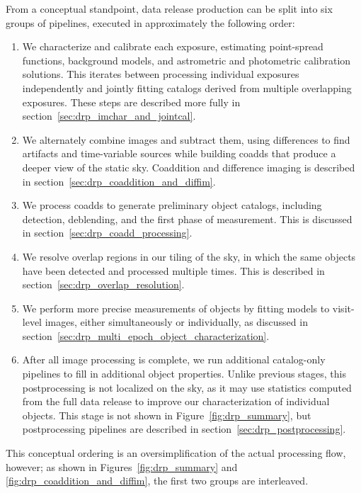 From a conceptual standpoint, data release production can be split into six groups of pipelines, executed in approximately the following order:
\begin{enumerate}
\item We characterize and calibrate each exposure, estimating point-spread functions, background models, and astrometric and photometric calibration solutions.  This iterates between processing individual exposures independently and jointly fitting catalogs derived from multiple overlapping exposures.  These steps are described more fully in section~\ref{sec:drp_imchar_and_jointcal}.
\item We alternately combine images and subtract them, using differences to find artifacts and time-variable sources while building coadds that produce a deeper view of the static sky.  Coaddition and difference imaging is described in section~\ref{sec:drp_coaddition_and_diffim}.
\item We process coadds to generate preliminary object catalogs, including detection, deblending, and the first phase of measurement.  This is discussed in section~\ref{sec:drp_coadd_processing}.
\item We resolve overlap regions in our tiling of the sky, in which the same objects have been detected and processed multiple times.  This is described in section~\ref{sec:drp_overlap_resolution}.
\item We perform more precise measurements of objects by fitting models to visit-level images, either simultaneously or individually, as discussed in section~\ref{sec:drp_multi_epoch_object_characterization}.
\item After all image processing is complete, we run additional catalog-only pipelines to fill in additional object properties.  Unlike previous stages, this postprocessing is not localized on the sky, as it may use statistics computed from the full data release to improve our characterization of individual objects.  This stage is not shown in Figure~\ref{fig:drp_summary}, but postprocessing pipelines are described in section~\ref{sec:drp_postprocessing}.
\end{enumerate}
This conceptual ordering is an oversimplification of the actual processing flow, however; as shown in Figures~\ref{fig:drp_summary} and \ref{fig:drp_coaddition_and_diffim}, the first two groups are interleaved.

